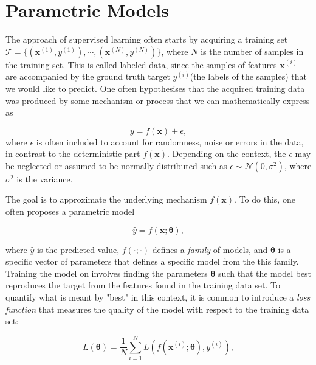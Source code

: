\section{Parametric Models}\label{sec:ParametricModels}
The approach of supervised learning often starts by acquiring a training set $\mathcal{T} = \{(\boldsymbol{x}^{(1)}, y^{(1)}), \cdots, (\boldsymbol{x}^{(N)}, y^{(N)})\}$, where $N$ is the number of samples in the training set. This is called labeled data, since the samples of features $\boldsymbol{x}^{(i)}$ are accompanied by the ground truth target $y^{(i)}$(the labels of the samples) that we would like to predict. One often hypothesises that the acquired training data was produced by some mechanism or process that we can mathematically express as

\begin{equation*}
    y = f(\boldsymbol{x}) + \epsilon,
\end{equation*}
where $\epsilon$ is often included to account for randomness, noise or errors in the data, in contrast to the deterministic part $f(\boldsymbol{x})$. Depending on the context, the $\epsilon$ may be neglected or assumed to be normally distributed such as $\epsilon \sim \mathcal{N}(0, \sigma^2)$, where $\sigma^2$ is the variance.

The goal is to approximate the underlying mechanism $f(\boldsymbol{x})$. To do this, one often proposes a parametric model

\begin{equation*}
    \hat{y} = f(\boldsymbol{x}; \boldsymbol{\theta}),
\end{equation*}

where $\hat{y}$ is the predicted value, $f(\cdot; \cdot)$ defines a \emph{family} of models, and $\boldsymbol{\theta}$ is a specific vector of parameters that defines a specific model from the this family. Training the model on involves finding the parameters $\boldsymbol{\theta}$ such that the model best reproduces the target from the features found in the training data set. To quantify what is meant by "best" in this context, it is common to introduce a \emph{loss function} that measures the quality of the model with respect to the training data set:

\begin{equation}\label{eq:LossFunction}
    L(\boldsymbol{\theta}) = \frac{1}{N}\sum_{i=1}^{N} L(f(\boldsymbol{x}^{(i)}; \boldsymbol{\theta}) , y^{(i)}),
\end{equation}

